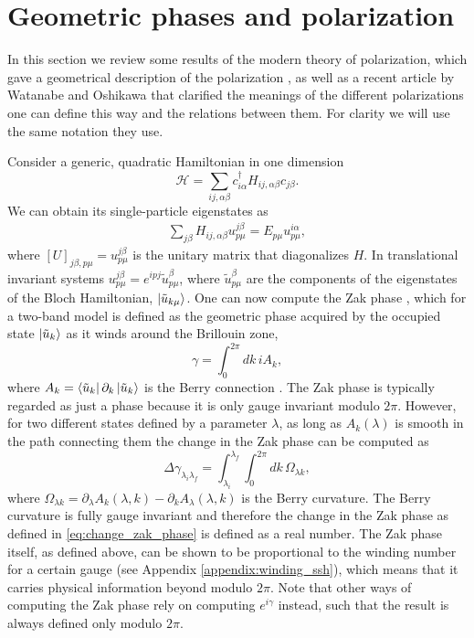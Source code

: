 \documentclass[twocolumn,amsmath,longbibliography,amssymb,superscriptaddress]{revtex4-1}
\begin{document}
\section{Geometric phases and polarization}

In this section we review some results of the modern theory of polarization, which gave a geometrical description of the polarization \cite{Resta1992,KingSmith1993,Vanderbilt1993,Resta1997} , as well as a recent article by Watanabe and Oshikawa \cite{Watanabe2018} that clarified the meanings of the different polarizations one can define this way and the relations between them. For clarity we will use the same notation they use. 

Consider a generic, quadratic Hamiltonian in one dimension
\begin{equation}\label{eq:quadr_Ham}
\mathcal{H} = \sum_{ij,\alpha\beta} c_{i\alpha}^\dagger H_{ij,\alpha \beta}c_{j\beta}.
\end{equation}
We can obtain its single-particle eigenstates as
\begin{align}
\sum_{j\beta}H_{ij,\alpha\beta} u_{p\mu}^{j\beta} = E_{p\mu} u^{i\alpha}_{p\mu},
\end{align}
where $[U]_{j\beta,p\mu} = u_{p\mu}^{j\beta}$ is the unitary matrix that diagonalizes $H$. In translational invariant systems $u_{p\mu}^{j\beta} = e^{ipj}\tilde{u}_{p \mu}^{\beta}$, where $\tilde{u}_{p \mu}^{\beta}$ are the components of the eigenstates of the Bloch Hamiltonian, $\ket{\tilde{u}_{k\mu}}$. One can now compute the Zak phase \cite{Zak1989}, which for a two-band model is defined as the geometric phase acquired by the occupied state $\ket{\tilde{u}_k}$ as it winds around the Brillouin zone,
\begin{equation}
\gamma = \int_{0}^{2\pi} dk\, i A_k, 
\label{eq:zak_phase}
\end{equation}
where $A_k = \bra{\tilde{u}_k}\partial_k \ket{\tilde{u}_k}$ is the Berry connection \cite{Berry1984}. The Zak phase is typically regarded as just a phase because it is only gauge invariant modulo $2\pi$. However, for two different states defined by a parameter $\lambda$, as long as $A_k(\lambda)$ is smooth in the path connecting them the change in the Zak phase can be computed as
\begin{equation}
\Delta {\gamma_{\lambda_i \lambda_f}} = \int_{\lambda_i}^{\lambda_f}\int_{0}^{2\pi} dk \, \Omega_{\lambda k},
\label{eq:change_zak_phase}
\end{equation}
where $\Omega_{\lambda k} = \partial_\lambda A_k(\lambda,k) - \partial_k A_\lambda(\lambda,k)$ is the Berry curvature. The Berry curvature is fully gauge invariant and therefore the change in the Zak phase as defined in \eqref{eq:change_zak_phase} is defined as a real number. The Zak phase itself, as defined above, can be shown to be proportional to the winding number for a certain gauge (see Appendix \ref{appendix:winding_ssh}), which means that it carries physical information beyond modulo $2\pi$. Note that other ways of computing the Zak phase rely on computing $e^{i\gamma}$ instead, such that the result is always defined only modulo $2\pi$.
\end{document}
